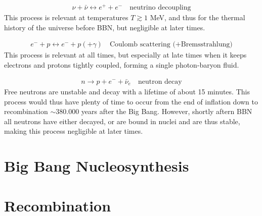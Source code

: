 \begin{align}
    \nu + \bar{\nu} \leftrightarrow e^+ + e^- \quad \text{neutrino decoupling}
\end{align}
This process is relevant at temperatures $T \gtrsim 1$ MeV, and thus for the thermal history of the universe before BBN, but negligible at later times.

\begin{align}
    e^-+p \leftrightarrow e^-+ p (+\gamma)\quad \text{Coulomb scattering (+Bremsstrahlung)}
\end{align}
This process is relevant at all times, but especially at late times when it keeps electrons and protons tightly coupled, forming a single photon-baryon fluid.

\begin{align}
    n\to p + e^- + \bar{\nu}_e \quad \text{neutron decay}
\end{align}
Free neutrons are unstable and decay with a lifetime of about 15 minutes.
This process would thus have plenty of time to occur from the end of inflation down to recombination $\sim 380.000$ years after the Big Bang.
However, shortly aftern BBN all neutrons have either decayed, or are bound in nuclei and are thus stable, making this process negligible at later times.












\section{Big Bang Nucleosynthesis}




\section{Recombination}

